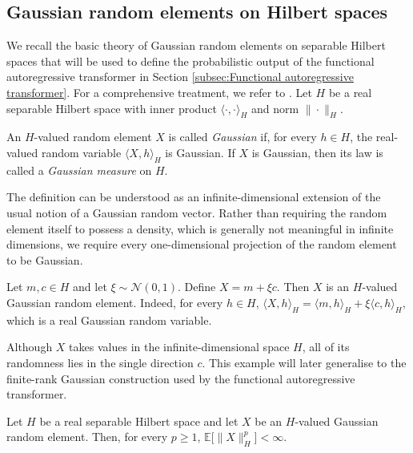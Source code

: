 \subsection{Gaussian random elements on Hilbert spaces}\label{subsec:Gaussian random elements on Hilbert spaces}

We recall the basic theory of Gaussian random elements on separable Hilbert spaces that will be used to define the probabilistic output of the functional autoregressive transformer in Section \ref{subsec:Functional autoregressive transformer}. For a comprehensive treatment, we refer to \cite{Bogachev1998}.
Let \(H\) be a real separable Hilbert space with inner product \(\langle\cdot,\cdot\rangle_H\) and norm \(\|\cdot\|_H\).

\begin{definition}
An \(H\)-valued random element \(X\) is called \emph{Gaussian} if, for every \(h\in H\), the real-valued random variable \(\langle X,h\rangle_H\) is Gaussian. If \(X\) is Gaussian, then its law is called a \emph{Gaussian measure} on \(H\).
\end{definition}

The definition can be understood as an infinite-dimensional extension of the usual notion of a Gaussian random vector. Rather than requiring the random element itself to possess a density, which is generally not meaningful in infinite dimensions, we require every one-dimensional projection of the random element to be Gaussian.

\begin{example}[]
Let \(m,c\in H\) and let \(\xi\sim\mathcal N(0,1)\). Define \(X=m+\xi c\). Then \(X\) is an \(H\)-valued Gaussian random element. Indeed, for every \(h\in H\), \(\langle X,h\rangle_H=\langle m,h\rangle_H+\xi\langle c,h\rangle_H\), which is a real Gaussian random variable.

Although \(X\) takes values in the infinite-dimensional space \(H\), all of its randomness lies in the single direction \(c\). This example will later generalise to the finite-rank Gaussian construction used by the functional autoregressive transformer.
\end{example}

\begin{theorem}\label{thm:Finite moments of Gaussian random elements}
Let \(H\) be a real separable Hilbert space and let \(X\) be an \(H\)-valued Gaussian random element. Then, for every \(p\geqslant1\), \(\mathbb E\bigl[\|X\|_H^p\bigr]<\infty\).
\end{theorem}

